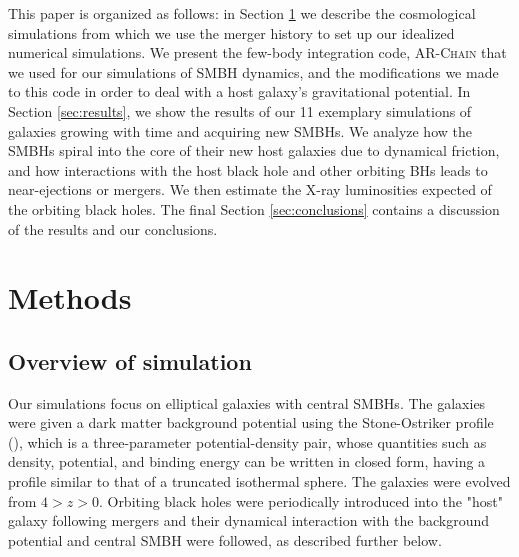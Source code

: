 \documentclass[english, apj]{emulateapj}
\begin{document}
This paper is organized as follows: in Section \ref{sec:methods} we describe the cosmological simulations from which we use the merger history to set up our idealized numerical simulations. We present the few-body integration code, \textsc{AR-Chain} that we used for our simulations of SMBH dynamics, and the modifications we made to this code in order to deal with a host galaxy's gravitational potential. In Section \ref{sec:results}, we show the results of our 11 exemplary simulations of galaxies growing with time and acquiring new SMBHs. We analyze how the SMBHs spiral into the core of their new host galaxies due to dynamical friction, and how interactions with the host black hole and other orbiting BHs leads to near-ejections or mergers. We then estimate the X-ray luminosities expected of the orbiting black holes.  The final Section \ref{sec:conclusions} contains a discussion of the results and our conclusions.


\section{Methods}\label{sec:methods}

\subsection{Overview of simulation}
Our simulations focus on elliptical galaxies with central SMBHs. The galaxies were given a dark matter background potential using the Stone-Ostriker profile (\citet{2015ApJ...806L..28S}), which is a three-parameter potential-density pair, whose quantities such as density, potential, and binding energy can be written in closed form, having a profile similar to that of a truncated isothermal sphere.  The galaxies were evolved from $4 > z > 0$.  Orbiting black holes were periodically introduced into the "host" galaxy following mergers and their dynamical interaction with the background potential and central SMBH were followed, as described further below.
\end{document}
